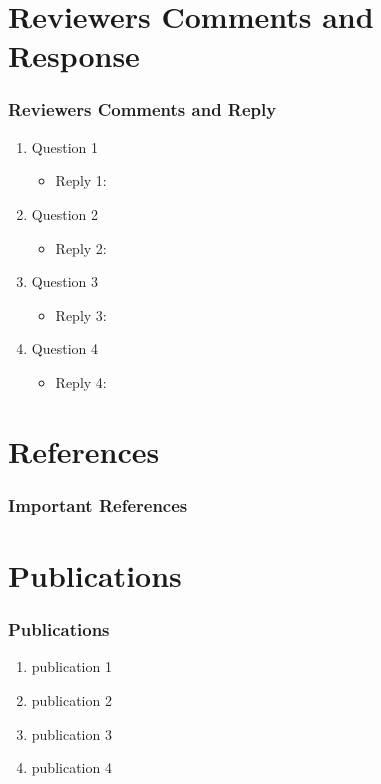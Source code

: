 \documentclass{beamer}
\begin{document}
\section{Reviewers Comments and Response }
\begin{frame}[allowframebreaks]
\frametitle{Reviewers Comments and Reply}
\begin{enumerate}
\item Question 1 
   \begin{itemize}
       \item Reply 1:
   \end{itemize}
\item Question 2
      \begin{itemize}
       \item Reply 2:
   \end{itemize}
\item Question 3
     \begin{itemize}
       \item Reply 3:
   \end{itemize}
\item Question 4
     \begin{itemize}
       \item Reply 4:
   \end{itemize}
\end{enumerate}

\end{frame}




\section{References}
\begin{frame}[allowframebreaks]
\frametitle{Important References}
 \nocite{*}
 

\end{frame}



\section{Publications}
\begin{frame} [allowframebreaks]
\frametitle{Publications}
\begin{enumerate}
\item publication 1 
\item publication 2
\item publication 3
\item publication 4
\end{enumerate}

\end{frame}
\end{document}
